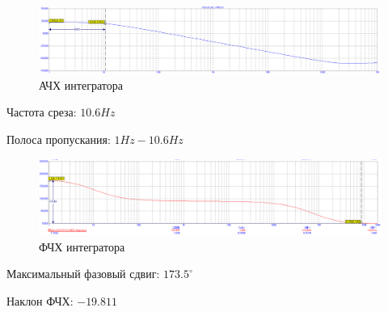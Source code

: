 \documentclass[a4paper,14pt]{article}
\begin{document}
\begin{figure}[H]
	\centering
	\includegraphics[width=\linewidth]{../imgs/int_fr}
	\caption{АЧХ интегратора}
	\label{fig:int_fr}
\end{figure}


Частота среза: $10.6Hz$

Полоса пропускания: $1Hz - 10.6Hz$

\begin{figure}[H]
	\centering
	\includegraphics[width=\linewidth]{../imgs/int_pr}
	\caption{ФЧХ интегратора}
	\label{fig:int_pr}
\end{figure}

Максимальный фазовый сдвиг: $173.5^{\circ}$

Наклон ФЧХ: $-19.811$
\end{document}
